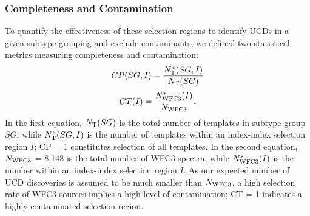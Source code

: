\documentclass[manuscript]{aastex63}
\begin{document}

\subsubsection{Completeness and Contamination}


To quantify the effectiveness of these selection regions to identify UCDs in a given subtype grouping and exclude contaminants, we defined two statistical metrics measuring completeness and contamination:
\begin{equation}
CP(SG,I) =\frac{N_{\rm T}^*(SG,I)}{N_{\rm T}(SG)}
\end{equation}
\begin{equation}
CT(I) = \frac{N_{\rm WFC3}^*(I)}{N_{\rm WFC3}}. 
\end{equation} 
In the first equation, $N_{\rm T}(SG)$ is the total number of templates in subtype group $SG$, while $N_{\rm T}^*(SG,I)$ is the number of templates within an index-index selection region $I$; CP = 1 constitutes selection of all templates.
In the second equation, $N_{\rm WFC3}$ = 8,148 is the total number of WFC3 spectra, while $N_{\rm WFC3}^*(I)$ is the number within an index-index selection region $I$. As our expected number of UCD discoveries is assumed to be much smaller than $N_{\rm WFC3}$, a high selection rate of WFC3 sources implies a high level of contamination; CT = 1 indicates a highly contaminated selection region. 
\end{document}
